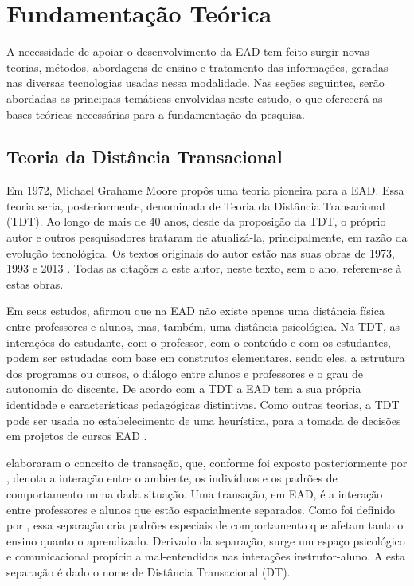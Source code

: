 \chapter{Fundamentação Teórica}

A necessidade de apoiar o desenvolvimento da EAD tem feito surgir novas teorias,
métodos, abordagens de ensino e tratamento das informações, geradas nas diversas
tecnologias usadas nessa modalidade. Nas seções seguintes, serão abordadas as
principais temáticas envolvidas neste estudo, o que oferecerá as bases teóricas
necessárias para a fundamentação da pesquisa.

\section{Teoria da Distância Transacional}

Em 1972, Michael Grahame Moore propôs uma teoria pioneira para a EAD. Essa
teoria seria, posteriormente, denominada de Teoria da Distância Transacional
(TDT). Ao longo de mais de 40 anos, desde da proposição da TDT, o próprio autor
e outros pesquisadores trataram de atualizá-la, principalmente, em razão da
evolução tecnológica. Os textos originais do autor estão nas suas obras de 1973,
1993 e 2013 \cite{moore1973transational}. Todas as citações a este autor, neste
texto, sem o ano, referem-se à estas obras.

Em seus estudos,  afirmou que na EAD não
existe apenas uma distância física entre professores e alunos, mas, também, uma
distância psicológica. Na TDT, as interações do estudante, com o professor, com
o conteúdo e com os estudantes, podem ser estudadas com base em construtos
elementares, sendo eles, a estrutura dos programas ou cursos, o diálogo entre
alunos e professores e o grau de autonomia do discente. De acordo com a TDT a
EAD tem a sua própria identidade e características pedagógicas distintivas. Como
outras teorias, a TDT pode ser usada no estabelecimento de uma heurística, para
a tomada de decisões em projetos de cursos EAD
\citeauthor{moore1973transational}.

 elaboraram o conceito de transação, que, conforme
foi exposto posteriormente por , denota a
interação entre o ambiente, os indivíduos e os padrões de comportamento numa
dada situação. Uma transação, em EAD, é a interação entre professores e alunos
que estão espacialmente separados. Como foi definido por
, essa separação cria padrões especiais
de comportamento que afetam tanto o ensino quanto o aprendizado. Derivado da
separação, surge um espaço psicológico e comunicacional propício a
mal-entendidos nas interações instrutor-aluno. A esta separação é dado o nome de
Distância Transacional (DT).

